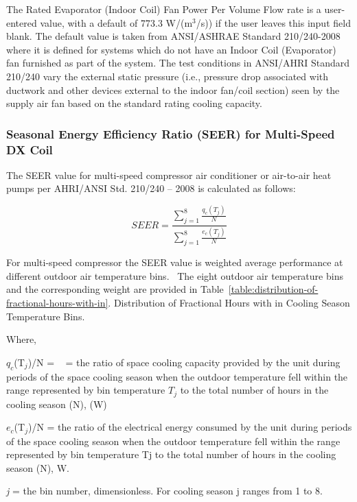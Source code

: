 The Rated Evaporator (Indoor Coil) Fan Power Per Volume Flow rate is a user-entered value, with a default of 773.3 W/(m\(^{3}\)/s)) if the user leaves this input field blank. The default value is taken from ANSI/ASHRAE Standard 210/240-2008 where it is defined for systems which do not have an Indoor Coil (Evaporator) fan furnished as part of the system. The test conditions in ANSI/AHRI Standard 210/240 vary the external static pressure (i.e., pressure drop associated with ductwork and other devices external to the indoor fan/coil section) seen by the supply air fan based on the standard rating cooling capacity.

\subsubsection{Seasonal Energy Efficiency Ratio (SEER) for Multi-Speed DX Coil}\label{seasonal-energy-efficiency-ratio-seer-for-multi-speed-dx-coil}

The SEER value for multi-speed compressor air conditioner or air-to-air heat pumps per AHRI/ANSI Std. 210/240 -- 2008 is calculated as follows:

\begin{equation}
SEER = \frac{{\sum\limits_{j = 1}^8 {\frac{{{q_c}({T_j})}}{N}} }}{{\sum\limits_{j = 1}^8 {\frac{{{e_c}({T_j})}}{N}} }}
\end{equation}

For multi-speed compressor the SEER value is weighted average performance at different outdoor air temperature bins.~ The eight outdoor air temperature bins and the corresponding weight are provided in Table~\ref{table:distribution-of-fractional-hours-with-in}. Distribution of Fractional Hours with in Cooling Season Temperature Bins.

Where,

\(q_{c}\)(T\(_{j}\))/N = ~ = the ratio of space cooling capacity provided by the unit during periods of the space cooling season when the outdoor temperature fell within the range represented by bin temperature \(T_{j}\) to the total number of hours in the cooling season (N), (W)

\(e_{c}\)(T\(_{j}\))/N = the ratio of the electrical energy consumed by the unit during periods of the space cooling season when the outdoor temperature fell within the range represented by bin temperature Tj to the total number of hours in the cooling season (N), W.

\emph{j} = the bin number, dimensionless. For cooling season j ranges from 1 to 8.

